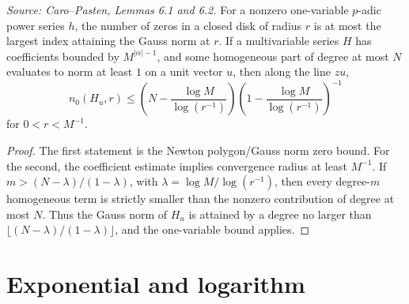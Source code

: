 \begin{lemma}
  \label{lem:cp_zero_estimates}
  \textit{Source: Caro--Pasten, Lemmas 6.1 and 6.2.}
  For a nonzero one-variable \(p\)-adic power series \(h\), the number of
  zeros in a closed disk of radius \(r\) is at most the largest index attaining
  the Gauss norm at \(r\).  If a multivariable series \(H\) has coefficients
  bounded by \(M^{|\alpha|-1}\), and some homogeneous part of degree at most
  \(N\) evaluates to norm at least \(1\) on a unit vector \(u\), then along the
  line \(zu\),
  \[
    n_0(H_u,r)\le
    \left(N-\frac{\log M}{\log(r^{-1})}\right)
    \left(1-\frac{\log M}{\log(r^{-1})}\right)^{-1}
  \]
  for \(0<r<M^{-1}\).
\end{lemma}
\begin{proof}
  The first statement is the Newton polygon/Gauss norm zero bound.  For the
  second, the coefficient estimate implies convergence radius at least
  \(M^{-1}\).  If \(m>(N-\lambda)/(1-\lambda)\), with
  \(\lambda=\log M/\log(r^{-1})\), then every degree-\(m\) homogeneous term is
  strictly smaller than the nonzero contribution of degree at most \(N\).
  Thus the Gauss norm of \(H_u\) is attained by a degree no larger than
  \(\lfloor(N-\lambda)/(1-\lambda)\rfloor\), and the one-variable bound applies.
\end{proof}

\section{Exponential and logarithm}

